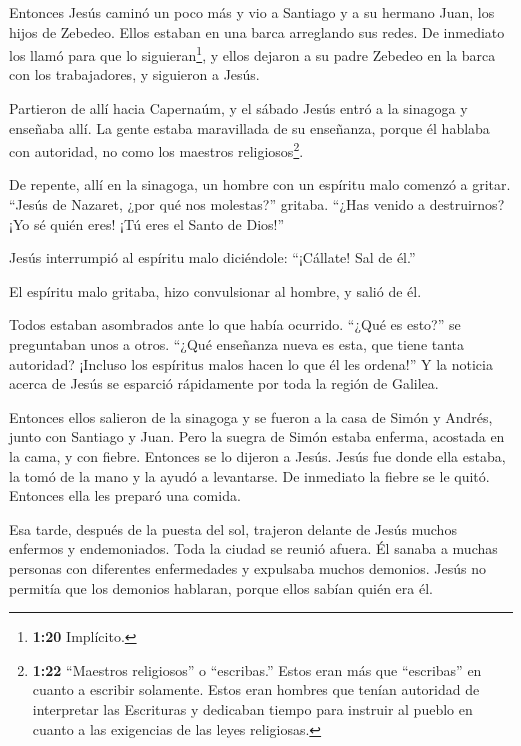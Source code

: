  Entonces Jesús caminó un poco más y vio a Santiago y a su
hermano Juan, los hijos de Zebedeo. Ellos estaban en una barca
arreglando sus redes.  De inmediato los llamó para que lo
siguieran\footnote{\textbf{1:20} Implícito.}, y ellos dejaron a su padre
Zebedeo en la barca con los trabajadores, y siguieron a Jesús.

 Partieron de allí hacia Capernaúm, y el sábado Jesús entró
a la sinagoga y enseñaba allí.  La gente estaba maravillada
de su enseñanza, porque él hablaba con autoridad, no como los maestros
religiosos\footnote{\textbf{1:22} ``Maestros religiosos'' o
  ``escribas.'' Estos eran más que ``escribas'' en cuanto a escribir
  solamente. Estos eran hombres que tenían autoridad de interpretar las
  Escrituras y dedicaban tiempo para instruir al pueblo en cuanto a las
  exigencias de las leyes religiosas.}.

 De repente, allí en la sinagoga, un hombre con un espíritu
malo comenzó a gritar.  ``Jesús de Nazaret, ¿por qué nos
molestas?'' gritaba. ``¿Has venido a destruirnos? ¡Yo sé quién eres! ¡Tú
eres el Santo de Dios!''

 Jesús interrumpió al espíritu malo diciéndole: ``¡Cállate!
Sal de él.''

 El espíritu malo gritaba, hizo convulsionar al hombre, y
salió de él.

 Todos estaban asombrados ante lo que había ocurrido.
``¿Qué es esto?'' se preguntaban unos a otros. ``¿Qué enseñanza nueva es
esta, que tiene tanta autoridad? ¡Incluso los espíritus malos hacen lo
que él les ordena!''  Y la noticia acerca de Jesús se
esparció rápidamente por toda la región de Galilea.

 Entonces ellos salieron de la sinagoga y se fueron a la
casa de Simón y Andrés, junto con Santiago y Juan.  Pero la
suegra de Simón estaba enferma, acostada en la cama, y con fiebre.
Entonces se lo dijeron a Jesús.  Jesús fue donde ella
estaba, la tomó de la mano y la ayudó a levantarse. De inmediato la
fiebre se le quitó. Entonces ella les preparó una comida.

 Esa tarde, después de la puesta del sol, trajeron delante
de Jesús muchos enfermos y endemoniados.  Toda la ciudad se
reunió afuera.  Él sanaba a muchas personas con diferentes
enfermedades y expulsaba muchos demonios. Jesús no permitía que los
demonios hablaran, porque ellos sabían quién era él.

